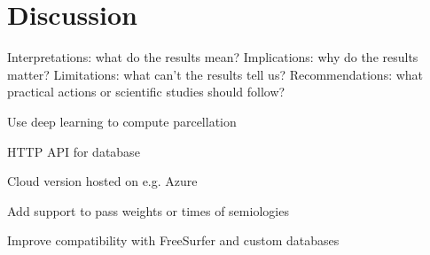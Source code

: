 \section{Discussion}

Interpretations: what do the results mean?
Implications: why do the results matter?
Limitations: what can’t the results tell us?
Recommendations: what practical actions or scientific studies should follow?


Use deep learning to compute parcellation

HTTP API for database

Cloud version hosted on e.g. Azure

Add support to pass weights or times of semiologies

Improve compatibility with FreeSurfer and custom databases
